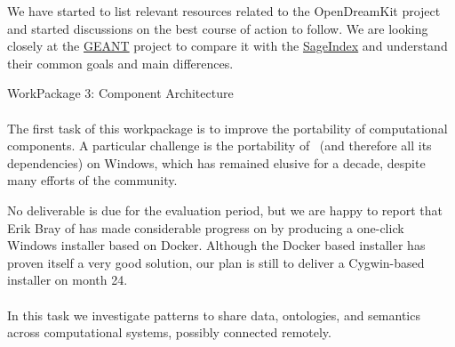\documentclass{deliverablereport}
\makeatletter
\renewcommand\subsubsection{\@startsection{subsubsection}{2}%
  \z@{.5\linespacing\@plus.7\linespacing}{.1\linespacing}%
  {\normalfont\bfseries}}
\makeatother
\begin{document}
We have started to list relevant resources related to the OpenDreamKit project and started discussions
on the best course of action to follow. We are looking closely at the \href{https://oer.geant.org/}{GEANT} 
project to compare it with the \href{http://sageindex.lipn.univ-paris13.fr/}{SageIndex} and understand their
common goals and main differences.

\clearpage
  \subsubsection{WorkPackage 3:  Component Architecture}

  \paragraph{}
  \label{component-architecture@portability}
  The first task of this workpackage is to improve the portability of
  computational components. A particular challenge is the portability
  of \Sage\ (and therefore all its dependencies) on Windows, which has
  remained elusive for a decade, despite many efforts of the
  community.

  No deliverable is due for the evaluation period, but we are happy to
  report that Erik Bray of  has made considerable progress on
   by producing a
  one-click Windows installer based on Docker. Although the Docker
  based installer has proven itself a very good solution, our plan is
  still to deliver a Cygwin-based installer on month 24.


  \paragraph{}
  In this task we investigate patterns to share data, ontologies,
  and semantics across computational systems, possibly connected
  remotely.

\end{document}
